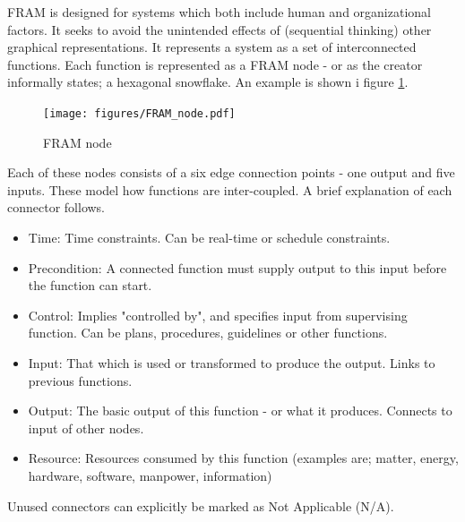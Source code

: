 FRAM is designed for systems which both include human and organizational factors. It seeks to avoid the unintended effects of (sequential thinking) other graphical representations. It represents a system as a set of interconnected functions. Each function is represented as a FRAM node - or as the creator informally states; a hexagonal snowflake. An example is shown i figure \ref{fig:fram_node}.

\begin{figure}[h]
 \centering
   \texttt{[image: figures/FRAM\_node.pdf]}
 \caption{FRAM node}
 \label{fig:fram_node}
\end{figure}

Each of these nodes consists of a six edge connection points - one output and five inputs. These  model how functions are inter-coupled. A brief explanation of each connector follows.


\begin{itemize}
  \item Time: Time constraints. Can be real-time or schedule constraints.

  \item Precondition: A connected function must supply output to this input before the function can start.

  \item Control: Implies "controlled by", and specifies input from supervising function. Can be plans, procedures, guidelines or other functions.
  
  \item Input: That which is used or transformed to produce the output. Links to previous functions.

  \item Output: The basic output of this function - or what it produces. Connects to input of other nodes.
  \item Resource: Resources consumed by this function (examples are; matter, energy, hardware, software, manpower, information)
\end{itemize} 
Unused connectors can explicitly be marked as Not Applicable (N/A).




